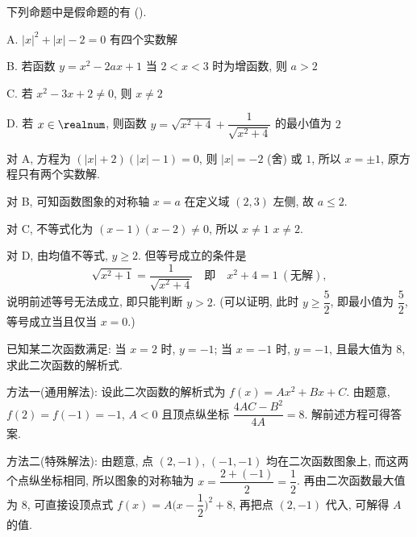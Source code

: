 \begin{example}
  下列命题中是假命题的有 (\qquad).
  
  A. $|x|^2+|x|-2=0$ 有四个实数解
  
  B. 若函数 $y=x^2-2ax+1$ 当 $2<x<3$ 时为增函数, 则 $a>2$
  
  C. 若 $x^2-3x+2\neq 0$, 则 $x\neq 2$
  
  D. 若 $x\in\realnum$, 则函数 $y=\sqrt{x^2+4}+\dfrac1{\sqrt{x^2+4}}$ 的最小值为 $2$   
\end{example}
\begin{solution}
  对 A, 方程为 $(|x|+2)(|x|-1)=0$, 则 $|x|=-2$ (舍) 或 $1$, 所以 $x=\pm1$, 原方程只有两个实数解.
  
  对 B, 可知函数图象的对称轴 $x=a$ 在定义域 $(2,3)$ 左侧, 故 $a\leqslant 2$.
  
  对 C, 不等式化为 $(x-1)(x-2)\neq 0$, 所以 $x\neq 1$  $x\neq 2$.
  
  对 D, 由均值不等式, $y\geqslant 2$. 但等号成立的条件是 
  \[\sqrt{x^2+1}=\dfrac1{\sqrt{x^2+4}}\quad\text{即}\quad x^2+4=1\ (\text{无解}),\]
  说明前述等号无法成立, 即只能判断 $y>2$. (可以证明, 此时 $y\geqslant \dfrac52$, 即最小值为 $\dfrac52$, 等号成立当且仅当 $x=0$.)
\end{solution}

\begin{example}
  已知某二次函数满足: 当 $x=2$ 时, $y=-1$; 当 $x=-1$ 时, $y=-1$, 且最大值为 $8$, 求此二次函数的解析式.
\end{example}
\begin{solution}
  方法一(通用解法): 设此二次函数的解析式为 $f(x)=Ax^2+Bx+C$. 由题意, $f(2)=f(-1)=-1$, $A<0$ 且顶点纵坐标 $\dfrac{4AC-B^2}{4A}=8$. 解前述方程可得答案.
  
  方法二(特殊解法): 由题意, 点 $(2,-1)$, $(-1,-1)$ 均在二次函数图象上, 而这两个点纵坐标相同, 所以图象的对称轴为 $x=\dfrac{2+(-1)}2=\dfrac12$. 再由二次函数最大值为 $8$, 可直接设顶点式 $f(x)=A\biggl(x-\dfrac12\biggr)^2+8$, 再把点 $(2,-1)$ 代入, 可解得 $A$ 的值.
\end{solution}



